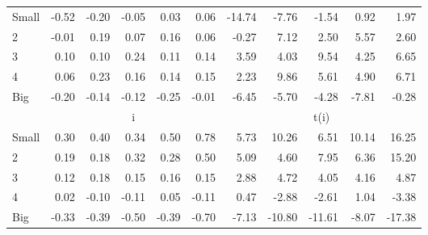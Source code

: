 \begin{table}[!ht]
\begin{tabular}{lrrrrrrrrrr}
    \\
      \cmidrule(r){2-6} \cmidrule(r){7-11}

    Small   & -0.52  & -0.20  & -0.05  & 0.03  & 0.06  & -14.74  & -7.76  & -1.54  & 0.92  & 1.97  \\
         2  & -0.01  & 0.19  & 0.07  & 0.16  & 0.06  & -0.27  & 7.12  & 2.50  & 5.57  & 2.60  \\
         3  & 0.10  & 0.10  & 0.24  & 0.11  & 0.14  & 3.59  & 4.03  & 9.54  & 4.25  & 6.65  \\
         4  & 0.06  & 0.23  & 0.16  & 0.14  & 0.15  & 2.23  & 9.86  & 5.61  & 4.90  & 6.71  \\
    Big     & -0.20  & -0.14  & -0.12  & -0.25  & -0.01  & -6.45  & -5.70  & -4.28  & -7.81  & -0.28  \\

  
    
      & \multicolumn{5}{c}{i} & \multicolumn{5}{c}{t(i)}
    
    \\
      \cmidrule(r){2-6} \cmidrule(r){7-11}

    Small   & 0.30  & 0.40  & 0.34  & 0.50  & 0.78  & 5.73  & 10.26  & 6.51  & 10.14  & 16.25  \\
         2  & 0.19  & 0.18  & 0.32  & 0.28  & 0.50  & 5.09  & 4.60  & 7.95  & 6.36  & 15.20  \\
         3  & 0.12  & 0.18  & 0.15  & 0.16  & 0.15  & 2.88  & 4.72  & 4.05  & 4.16  & 4.87  \\
         4  & 0.02  & -0.10  & -0.11  & 0.05  & -0.11  & 0.47  & -2.88  & -2.61  & 1.04  & -3.38  \\
    Big     & -0.33  & -0.39  & -0.50  & -0.39  & -0.70  & -7.13  & -10.80  & -11.61  & -8.07  & -17.38  \\

  

  \bottomrule
\end{tabular}
\label{tbl:25_Size_Inv_FF2015}
\end{table}